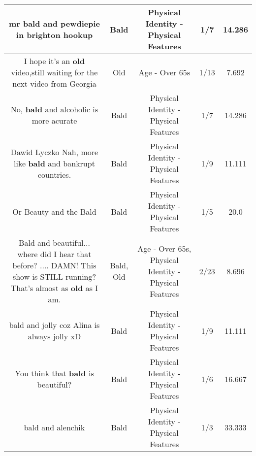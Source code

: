 \documentclass[11pt]{article}
\newlength\mylength
\begin{document}
\begin{center}
\begin{longtable}{|C{.65\mylength}|C{.30\mylength}|C{.12\mylength}|C{.12\mylength}|C{.12\mylength}|}
  \small mr \textbf{bald} and pewdiepie in brighton hookup\normalsize   & Bald & Physical Identity - Physical Features & 1/7 & 14.286 \\  \hline
  \small I hope it's an \textbf{old} video,still waiting for the next video from Georgia\normalsize   & Old & Age - Over 65s & 1/13 & 7.692 \\  \hline
  \small No, \textbf{bald} and alcoholic is more acurate\normalsize   & Bald & Physical Identity - Physical Features & 1/7 & 14.286 \\  \hline
  \small Dawid Lyczko Nah, more like \textbf{bald} and bankrupt countries.\normalsize   & Bald & Physical Identity - Physical Features & 1/9 & 11.111 \\  \hline
  \small Or Beauty and the Bald\normalsize   & Bald & Physical Identity - Physical Features & 1/5 & 20.0 \\  \hline
  \small Bald and beautiful... where did I hear that before? .... DAMN! This show is STILL running? That's almost as \textbf{old} as I am.\normalsize   & Bald, Old & Age - Over 65s, Physical Identity - Physical Features & 2/23 & 8.696 \\  \hline
  \small bald and jolly coz Alina is always jolly xD\normalsize   & Bald & Physical Identity - Physical Features & 1/9 & 11.111 \\  \hline
  \small You think that \textbf{bald} is beautiful?\normalsize   & Bald & Physical Identity - Physical Features & 1/6 & 16.667 \\  \hline
  \small bald and alenchik\normalsize   & Bald & Physical Identity - Physical Features & 1/3 & 33.333 \\  \hline

\end{longtable}
\end{center}
\end{document}
